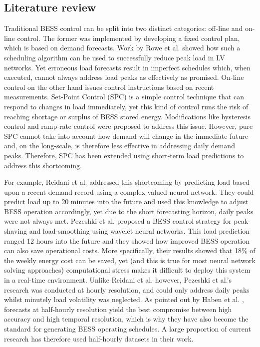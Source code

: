 \subsection{Literature review}
\label{ch2:subsec:literature-review}

Traditional BESS control can be split into two distinct categories: off-line and on-line control.
The former was implemented by developing a fixed control plan, which is based on demand forecasts.
Work by Rowe et al. \cite{Rowe2014a} showed how such a scheduling algorithm can be used to successfully reduce peak load in LV networks.
Yet erroneous load forecasts result in imperfect schedules which, when executed, cannot always address load peaks as effectively as promised.
On-line control on the other hand issues control instructions based on recent measurements.
Set-Point Control (SPC) is a simple control technique that can respond to changes in load immediately, yet this kind of control runs the risk of reaching shortage or surplus of BESS stored energy.
Modifications like hysteresis control \cite{Gybel2012} and ramp-rate control \cite{Such2012} were proposed to address this issue.
However, pure SPC cannot take into account how demand will change in the immediate future and, on the long-scale, is therefore less effective in addressing daily demand peaks.
Therefore, SPC has been extended using short-term load predictions to address this shortcoming.

For example, Reidani et al. \cite{Reihani2016} addressed this shortcoming by predicting load based upon a recent demand record using a complex-valued neural network.
They could predict load up to 20 minutes into the future and used this knowledge to adjust BESS operation accordingly, yet due to the short forecasting horizon, daily peaks were not always met.
Pezeshki et al. \cite{Pezeshki2014} proposed a BESS control strategy for peak-shaving and load-smoothing using wavelet neural networks.
This load prediction ranged 12 hours into the future and they showed how improved BESS operation can also save operational costs.
More specifically, their results showed that 18\% of the weekly energy cost can be saved, yet (and this is true for most neural network solving approaches) computational stress makes it difficult to deploy this system in a real-time environment.
Unlike Reidani et al. however, Pezeshki et al.'s research was conducted at hourly resolution, and could only address daily peaks whilst minutely load volatility was neglected.
As pointed out by Haben et al. \cite{Poghosyan2014, Haben2014}, forecasts at half-hourly resolution yield the best compromise between high accuracy and high temporal resolution, which is why they have also become the standard for generating BESS operating schedules.
A large proportion of current research has therefore used half-hourly datasets in their work.

